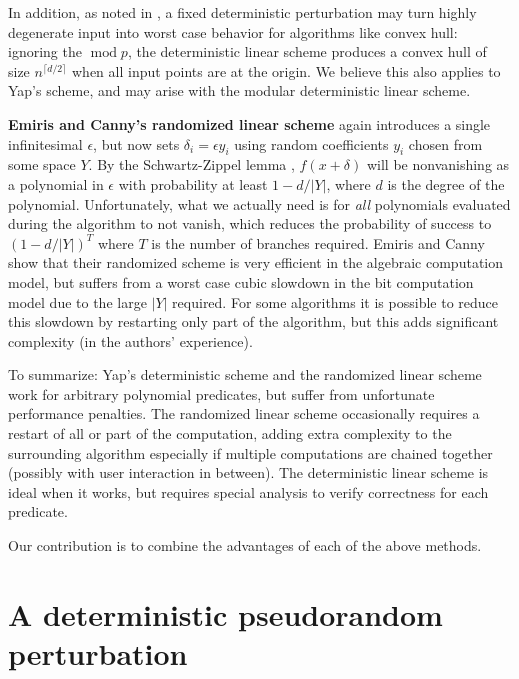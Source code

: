 \documentclass[11pt]{article}
\begin{document}
In addition, as noted in \cite{burnikel1994degeneracy}, a fixed deterministic perturbation may turn highly degenerate input into worst case behavior for algorithms
like convex hull: ignoring the $\operatorname{mod} p$, the deterministic linear scheme produces a convex hull of size $n^{\lceil d/2 \rceil}$ when all input
points are at the origin.  We believe this also applies to Yap's scheme, and may arise with the modular deterministic linear scheme.

{\bf Emiris and Canny's randomized linear scheme} \cite{emiris1995general} again introduces a single infinitesimal $\epsilon$, but now sets
$\delta_i = \epsilon y_i$ using random coefficients $y_i$ chosen from some space $Y$.  By the Schwartz-Zippel lemma \cite{schwartz1980fast}, $f(x+\delta)$
will be nonvanishing as a polynomial in $\epsilon$ with probability at least $1 - d/|Y|$, where $d$ is the degree of the polynomial.  Unfortunately, what we
actually need is for \emph{all} polynomials evaluated during the algorithm to not vanish, which reduces the probability of success to
$(1 - d/|Y|)^T$ where $T$ is the number of branches required.  Emiris and Canny show that their randomized scheme is very efficient in the
algebraic computation model, but suffers from a worst case cubic slowdown in the bit computation model due to the large $|Y|$ required.  For some algorithms
it is possible to reduce this slowdown by restarting only part of the algorithm, but this adds significant complexity (in the authors' experience).

To summarize: Yap's deterministic scheme and the randomized linear scheme work for arbitrary polynomial predicates, but suffer from unfortunate performance penalties.
The randomized linear scheme occasionally requires a restart of all or part of the computation, adding extra complexity to the surrounding algorithm
especially if multiple computations are chained together (possibly with user interaction in between).  The deterministic linear scheme is ideal when it works,
but requires special analysis to verify correctness for each predicate.

Our contribution is to combine the advantages of each of the above methods.

\section{A deterministic pseudorandom perturbation}
\end{document}
